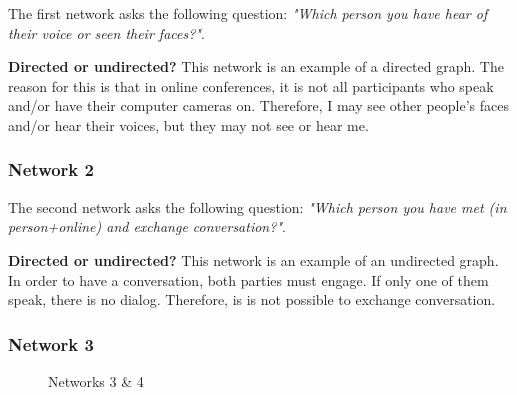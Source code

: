 The first network asks the following question: \textit{"Which person you have hear of their voice or seen their faces?"}.

\textbf{Directed or undirected?} This network is an example of a directed graph. The reason for this is that in online conferences, it is not all participants who speak and/or have their computer cameras on. Therefore, I may see other people's faces and/or hear their voices, but they may not see or hear me.

\subsubsection{Network 2}
The second network asks the following question: \textit{"Which person you have met (in person+online) and exchange conversation?"}.

\textbf{Directed or undirected?} This network is an example of an undirected graph. In order to have a conversation, both parties must engage. If only one of them speak, there is no dialog. Therefore, is is not possible to exchange conversation.

\subsubsection{Network 3}
\begin{figure}
    \centering
    \qquad
    \caption{Networks 3 \& 4}
    \label{fig:2}
\end{figure}

